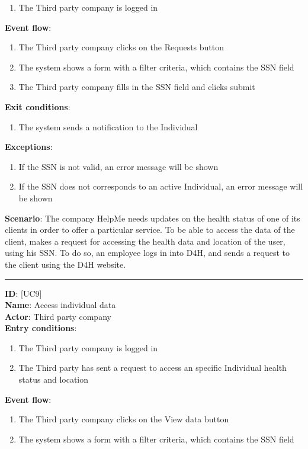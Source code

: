 \documentclass[hidelinks, 12pt]{report}
\newcommand\usecase[1]{ [UC#1] }
\begin{document}
\begin{itemize}
\begin{enumerate}
			\item{The Third party company is logged in}
		\end{enumerate}
		\textbf{Event flow}:
		\begin{enumerate}
			\item{The Third party company clicks on the Requests button}
			\item{The system shows a form with a filter criteria, which contains the SSN field}
			\item{The Third party company fills in the SSN field and clicks submit}
		\end{enumerate}
		\textbf{Exit conditions}:
		\begin{enumerate}
			\item{The system sends a notification to the Individual}
		\end{enumerate}
		\textbf{Exceptions}:
		\begin{enumerate}
			\item{If the SSN is not valid, an error message will be shown}
			\item{If the SSN does not corresponds to an active Individual, an error message will be shown}
		\end{enumerate}
		\textbf{Scenario}: The company HelpMe needs updates on the health status of one of its clients in order to offer a particular service. To be able to access the data of the client, makes a request for accessing the health data and location of the user, using his SSN. To do so, an employee logs in into D4H, and sends a request to the client using the D4H website.\\
		\rule{\linewidth}{0.4pt}
		\textbf{ID}: \usecase{9} \\
		\textbf{Name}: Access individual data \\
		\textbf{Actor}: Third party company \\
		\textbf{Entry conditions}:
		\begin{enumerate}
			\item{The Third party company is logged in}
			\item{The Third party has sent a request to access an specific Individual health status and location}
		\end{enumerate}
		\textbf{Event flow}:
		\begin{enumerate}
			\item{The Third party company clicks on the View data button}
			\item{The system shows a form with a filter criteria, which contains the SSN field}

\end{enumerate}
\end{itemize}
\end{document}
